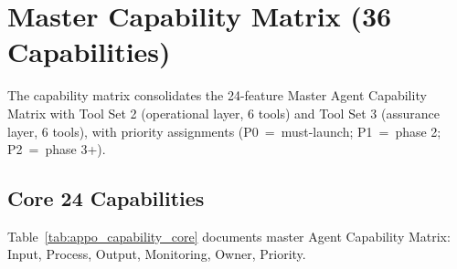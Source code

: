 \section{Master Capability Matrix (36 Capabilities)}
\label{sec:appo_capability_matrix}

The capability matrix consolidates the 24-feature Master Agent Capability Matrix with Tool Set 2 (operational layer, 6 tools) and Tool Set 3 (assurance layer, 6 tools), with priority assignments (P0~=~must-launch; P1~=~phase 2; P2~=~phase 3+).

\subsection{Core 24 Capabilities}
\noindent Table~\ref{tab:appo_capability_core} documents master Agent Capability Matrix: Input, Process, Output, Monitoring, Owner, Priority.

